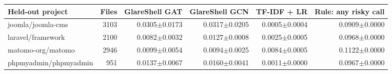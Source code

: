 \begin{tabular}{@{}lrrrrr@{}}
\toprule
Held-out project & Files & GlareShell GAT & GlareShell GCN & TF-IDF + LR & Rule: any risky call \\ \midrule
joomla/joomla-cms & 3103 & 0.0305$\pm$0.0173 & 0.0317$\pm$0.0205 & 0.0005$\pm$0.0004 & 0.0909$\pm$0.0000 \\
laravel/framework & 2100 & 0.0082$\pm$0.0032 & 0.0127$\pm$0.0008 & 0.0025$\pm$0.0005 & 0.0968$\pm$0.0000 \\
matomo-org/matomo & 2946 & 0.0099$\pm$0.0054 & 0.0094$\pm$0.0025 & 0.0084$\pm$0.0005 & 0.1122$\pm$0.0000 \\
phpmyadmin/phpmyadmin & 951 & 0.0137$\pm$0.0067 & 0.0160$\pm$0.0041 & 0.0011$\pm$0.0000 & 0.0967$\pm$0.0000 \\
\bottomrule
\end{tabular}
